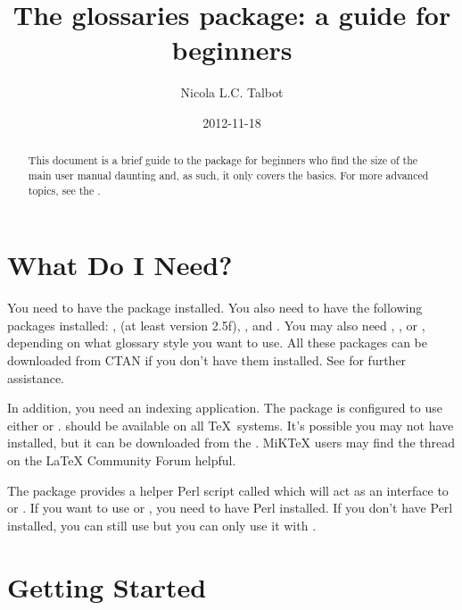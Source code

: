 \documentclass{nlctdoc}
\title{The glossaries package: a guide for beginners}
\author{Nicola L.C. Talbot}
\date{2012-11-18}
\begin{document}
\maketitle

\begin{abstract}
This document is a brief guide to the  package for
beginners who find the size of the main user manual daunting and, as
such, it only covers the basics. For more advanced topics, see the
.
\end{abstract}

\tableofcontents

\section{What Do I Need?}
\label{requirements}

You need to have the  package installed. You also
need to have the following packages installed: ,
 (at least version 2.5f), ,  and
.
You may also need , ,
 or , depending on what glossary style you want to use. All
these packages can be downloaded from CTAN if you don't have them
installed. See
 for further assistance.

In addition, you need an indexing application. The 
package is configured to use either  or .
 should be available on all \TeX\ systems. It's
possible you may not have  installed, but it can be
downloaded from the . MiKTeX users may find the
 thread on the LaTeX Community Forum helpful.

The  package provides a helper Perl script
called  which will act as an interface to
 or . If you want to use
 or , you need to have Perl
installed. If you don't have Perl installed, you can still use
 but you can only use it with .

\section{Getting Started}
\label{start}
\end{document}

